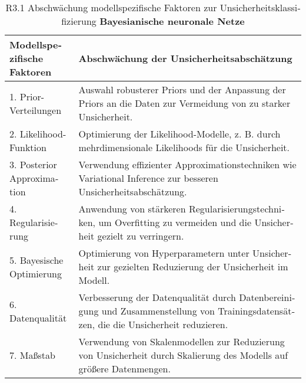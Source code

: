 \begin{otherlanguage}{ngerman}
\begin{table}[!htpb]
  \centering
  \footnotesize
  \begin{tabularx}{\textwidth}{|l|X|}
    \hline
    \textbf{Modellspezifische Faktoren} & \textbf{Abschwächung der Unsicherheitsabschätzung} \\
    \hline
    1. Prior-Verteilungen & Auswahl robusterer Priors und der Anpassung der Priors an die Daten zur Vermeidung von zu starker Unsicherheit. \\
    \hline
    2. Likelihood-Funktion & Optimierung der Likelihood-Modelle, z. B. durch mehrdimensionale Likelihoods für die Unsicherheit. \\
    \hline
    3. Posterior Approximation & Verwendung effizienter Approximationstechniken wie Variational Inference zur besseren Unsicherheitsabschätzung. \\
    \hline
    4. Regularisierung & Anwendung von stärkeren Regularisierungstechniken, um Overfitting zu vermeiden und die Unsicherheit gezielt zu verringern. \\
    \hline
    5. Bayesische Optimierung & Optimierung von Hyperparametern unter Unsicherheit zur gezielten Reduzierung der Unsicherheit im Modell. \\
    \hline
    6. Datenqualität & Verbesserung der Datenqualität durch Datenbereinigung und Zusammenstellung von Trainingsdatensätzen, die die Unsicherheit reduzieren. \\
    \hline
    7. Maßstab & Verwendung von Skalenmodellen zur Reduzierung von Unsicherheit durch Skalierung des Modells auf größere Datenmengen. \\
    \hline
  \end{tabularx}
  \caption{R3.1 Abschwächung modellspezifische Faktoren zur Unsicherheitsklassifizierung \textbf{\gls{Bayesianische neuronale Netze}}}\label{tab:chapter6r32}
\end{table}


\end{otherlanguage}
